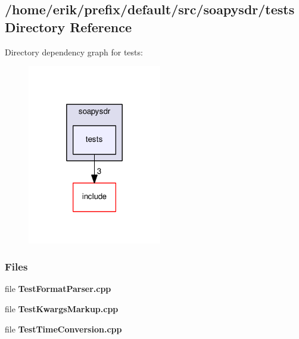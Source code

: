 \subsection{/home/erik/prefix/default/src/soapysdr/tests Directory Reference}
\label{dir_6bdddf7a0294a2a7368cfd2972b73a36}
Directory dependency graph for tests\+:
\nopagebreak
\begin{figure}[H]
\begin{center}
\leavevmode
\includegraphics[width=166pt]{dir_6bdddf7a0294a2a7368cfd2972b73a36_dep}
\end{center}
\end{figure}
\subsubsection*{Files}
\begin{DoxyCompactItemize}
\item 
file {\bf Test\+Format\+Parser.\+cpp}
\item 
file {\bf Test\+Kwargs\+Markup.\+cpp}
\item 
file {\bf Test\+Time\+Conversion.\+cpp}
\end{DoxyCompactItemize}
